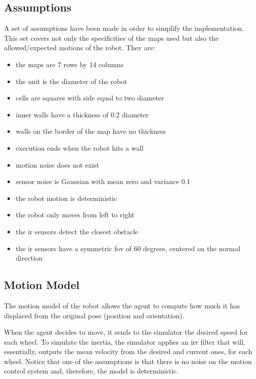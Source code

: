 \documentclass[runningheads]{llncs}
\begin{document}
\subsection{Assumptions}
\label{subsec:assumptions}

A set of assumptions have been made in order to simplify the implementation. This set covers not only the specificities of the maps used but also the allowed/expected motions of the robot. They are:

\begin{itemize}
    \item the maps are 7 rows by 14 columns
    \item the unit is the diameter of the robot
    \item cells are squares with side equal to two diameter
    \item inner walls have a thickness of 0.2 diameter
    \item walls on the border of the map have no thickness
    \item execution ends when the robot hits a wall 
    \item motion noise does not exist 
    \item sensor noise is Gaussian with mean zero and variance 0.1
    \item the robot motion is deterministic 
    \item the robot only moves from left to right
    \item the \Gls{ir} sensors detect the closest obstacle 
    \item the \Gls{ir} sensors have a symmetric \gls{fov} of 60 degrees, centered on the normal direction
\end{itemize}

\subsection{Motion Model}

The motion model of the robot allows the agent to compute how much it has displaced from the original pose (position and orientation).

When the agent decides to move, it sends to the simulator the desired speed for each wheel. To simulate the inertia, the simulator applies an \gls{irr} filter that will, essentially, outputs the mean velocity from the desired and current ones, for each wheel. Notice that one of the assumptions is that there is no noise on the motion control system and, therefore, the model is deterministic.
\end{document}
